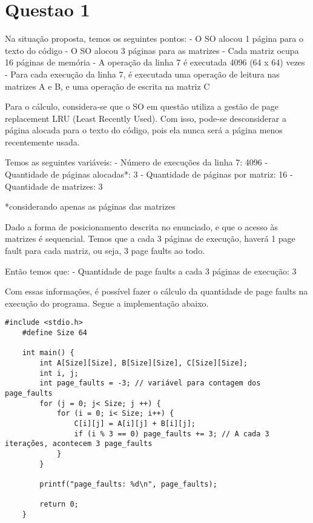 \chapter{Questao 1}


Na situação proposta, temos os seguintes pontos:
- O SO alocou 1 página para o texto do código
- O SO alocou 3 páginas para as matrizes
- Cada matriz ocupa 16 páginas de memória
- A operação da linha 7 é executada 4096 (64 x 64) vezes
- Para cada execução da linha 7, é executada
 uma operação de leitura nas matrizes A e B,
 e uma operação de escrita na matriz C

Para o cálculo, considera-se que o SO em questão utiliza a
 gestão de page replacement LRU (Least Recently Used). Com isso,
 pode-se desconsiderar a página alocada para o texto do código,
 pois ela nunca será a página menos recentemente usada.

Temos as seguintes variáveis:
 - Número de execuções da linha 7: 4096
 - Quantidade de páginas alocadas*: 3
 - Quantidade de páginas por matriz: 16
 - Quantidade de matrizes: 3

*considerando apenas as páginas das matrizes

Dado a forma de posicionamento descrita no enunciado, e que o 
acesso às matrizes é sequencial. Temos que a cada 3 páginas de
 execução, haverá 1 page fault para cada matriz, ou seja, 3 page
 faults ao todo.

Então temos que:
 - Quantidade de page faults a cada 3 páginas de execução: 3


Com essas informações, é possível fazer o cálculo da quantidade de
 page faults na execução do programa. Segue a implementação abaixo.

 \begin{lstlisting}[style=CStyle]
    #include <stdio.h>
    #define Size 64
    
    int main() {
        int A[Size][Size], B[Size][Size], C[Size][Size];
        int i, j;
        int page_faults = -3; // variável para contagem dos page_faults
        for (j = 0; j< Size; j ++) {
            for (i = 0; i< Size; i++) {
                C[i][j] = A[i][j] + B[i][j];
                if (i % 3 == 0) page_faults += 3; // A cada 3 iterações, acontecem 3 page_faults
            }
        }
    
        printf("page_faults: %d\n", page_faults);
    
        return 0;
    }
 \end{lstlisting}
 
